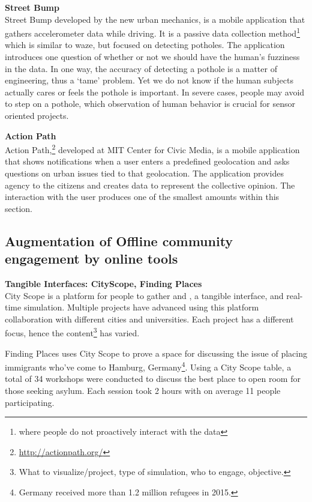 \textbf{Street Bump} \\
Street Bump developed by the new urban mechanics, is a mobile application that gathers accelerometer data while driving. It is a passive data collection method\footnote{where people do not proactively interact with the data} which is similar to waze, but focused on detecting potholes. The application introduces one question of whether or not we should have the human's fuzziness in the data. In one way, the accuracy of detecting a pothole is a matter of engineering, thus a `tame' problem. Yet we do not know if the human subjects actually cares or feels the pothole is important. In severe cases, people may avoid to step on a pothole, which observation of human behavior is crucial for sensor oriented projects. 
\cite{o2013exploiting}

\textbf{Action Path}\\
Action Path,\footnote{\url{http://actionpath.org/}} \cite{graeff2014crowdsourcing} developed at MIT Center for Civic Media, is a mobile application that shows notifications when a user enters a predefined geolocation and asks questions on urban issues tied to that geolocation. The application provides agency to the citizens and creates data to represent the collective opinion. The interaction with the user produces one of the smallest amounts within this section.

\subsection{Augmentation of Offline community engagement by online tools}

\textbf{Tangible Interfaces: CityScope, Finding Places}\\
City Scope is a platform for people to gather and , a tangible interface, and real-time simulation. Multiple projects have advanced using this platform collaboration with different cities and universities. Each project has a different focus, hence the content\footnote{What to visualize/project, type of simulation, who to engage, objective.} has varied.

Finding Places uses City Scope to prove a space for discussing the issue of placing immigrants who’ve come to Hamburg, Germany\footnote{Germany received more than 1.2 million refugees in 2015.}. Using a City Scope table, a total of 34 workshops were conducted to discuss the best place to open room for those seeking asylum. Each session took 2 hours with on average 11 people participating.

